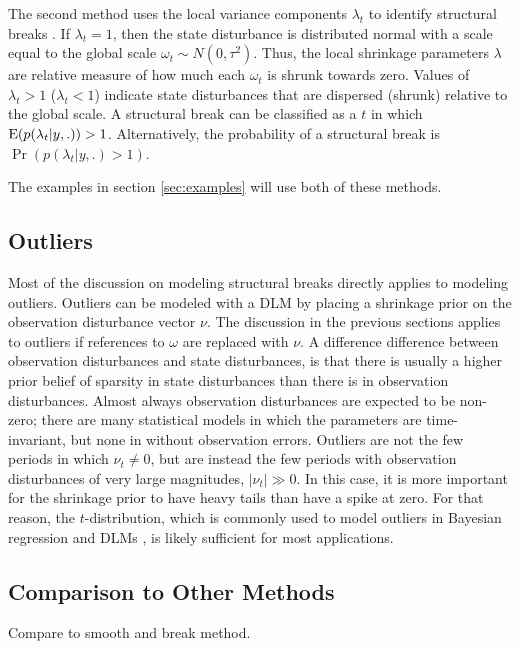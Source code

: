 \documentclass{article}
\begin{document}
The second method uses the local variance components $\lambda_{t}$ to identify structural breaks \parencite[179-180]{PetrisPetroneOmegal2009}.
If $\lambda_{t} = 1$, then the state disturbance is distributed normal with a scale equal to the global scale $\omega_{t} \sim N(0, \tau^{2})$.
Thus, the local shrinkage parameters $\lambda$ are relative measure of how much each $\omega_{t}$ is shrunk towards zero.
Values of $\lambda_{t} > 1$ ($\lambda_{t} < 1$) indicate state disturbances that are dispersed (shrunk) relative to the global scale.
A structural break can be classified as a $t$ in which $\operatorname{E} (p(\lambda_{t} | y, .)) > 1$.
Alternatively, the probability of a structural break is $\Pr(p(\lambda_{t} | y, .) > 1)$.

The examples in section \ref{sec:examples} will use both of these methods.

\subsection{Outliers}
\label{sec:outliers}

Most of the discussion on modeling structural breaks directly applies to modeling outliers.
Outliers can be modeled with a DLM by placing a shrinkage prior on the observation disturbance vector $\nu$. 
The discussion in the previous sections applies to outliers if references to $\omega$ are replaced with $\nu$.
A difference difference between observation disturbances and state disturbances, is that there is usually a higher prior belief of sparsity in state disturbances than there is in observation disturbances.
Almost always observation disturbances are expected to be non-zero;
there are many statistical models in which the parameters are time-invariant, but none in without observation errors.%
Outliers are not the few periods in which $\nu_{t} \neq 0$, but are instead the few periods with observation disturbances of very large magnitudes, $|\nu_{t}| \gg 0$.
In this case, it is more important for the shrinkage prior to have heavy tails than have a spike at zero. 
For that reason, the $t$-distribution, which is commonly used to model
outliers in Bayesian regression and DLMs \parencite{West1984}, is
likely sufficient for most applications.

\subsection{Comparison to Other Methods}
\label{sec:comp-other-meth-1}

Compare to smooth and break method.
\end{document}
